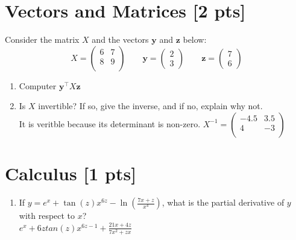 \documentclass[a4paper]{article}
\theoremstyle{definition}
\newenvironment{soln}{
    \leavevmode\color{blue}\ignorespaces
}{}
\begin{document}
\section{Vectors and Matrices [2 pts]}
Consider the matrix $X$ and the vectors $\mathbf{y}$ and $\textbf{z}$ below:
$$
X = \begin{pmatrix}
6 & 7 \\ 8 & 9 \\
\end{pmatrix}
\qquad \mathbf{y} = \begin{pmatrix}
2 \\ 3
\end{pmatrix} \qquad \mathbf{z} = \begin{pmatrix}
7 \\ 6
\end{pmatrix}
$$
\begin{enumerate}
	\item 	Computer $\mathbf{y}^\top X \mathbf{z}$\\
	    \begin{soln} 498 \end{soln}
	\item 	Is $X$ invertible? If so, give the inverse, and if no, explain why not.\\
        \begin{soln}  It is veritble because its determinant is non-zero. $X^{-1} =  \begin{pmatrix} -4.5 & 3.5 \\ 4 & -3 \\\end{pmatrix} $\end{soln}
\end{enumerate}


\section{Calculus [1 pts]}
\begin{enumerate}
	\item If $y = e^x + \tan(z)x^{6z} - \ln(\frac{7x + z}{x^{4}})$, what is the partial derivative of $y$ with respect to $x$?\\
	\begin{soln}  $e^x+6z{tan(z)}{x^{6z-1}}+\frac{21x+4z}{7x^2+zx} $\end{soln}
\end{enumerate}
\end{document}

